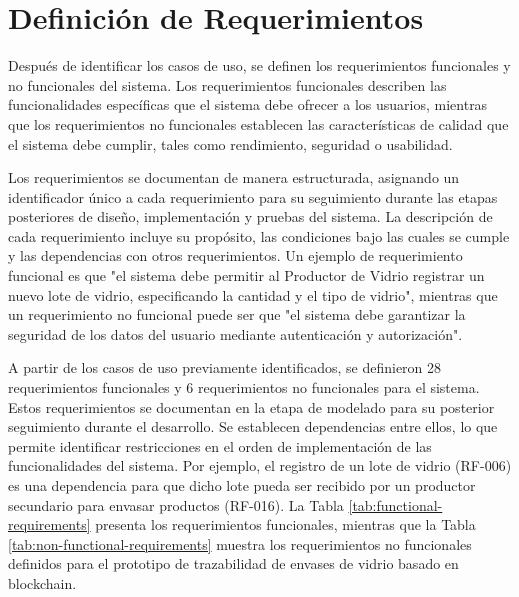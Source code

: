 \section{Definición de Requerimientos}
\label{sec:requirements-definition}

Después de identificar los casos de uso, se definen los requerimientos funcionales y no funcionales del sistema. Los requerimientos funcionales describen las funcionalidades específicas que el sistema debe ofrecer a los usuarios, mientras que los requerimientos no funcionales establecen las características de calidad que el sistema debe cumplir, tales como rendimiento, seguridad o usabilidad.

Los requerimientos se documentan de manera estructurada, asignando un identificador único a cada requerimiento para su seguimiento durante las etapas posteriores de diseño, implementación y pruebas del sistema. La descripción de cada requerimiento incluye su propósito, las condiciones bajo las cuales se cumple y las dependencias con otros requerimientos. Un ejemplo de requerimiento funcional es que "el sistema debe permitir al Productor de Vidrio registrar un nuevo lote de vidrio, especificando la cantidad y el tipo de vidrio", mientras que un requerimiento no funcional puede ser que "el sistema debe garantizar la seguridad de los datos del usuario mediante autenticación y autorización".

A partir de los casos de uso previamente identificados, se definieron 28 requerimientos funcionales y 6 requerimientos no funcionales para el sistema. Estos requerimientos se documentan en la etapa de modelado para su posterior seguimiento durante el desarrollo. Se establecen dependencias entre ellos, lo que permite identificar restricciones en el orden de implementación de las funcionalidades del sistema. Por ejemplo, el registro de un lote de vidrio (RF-006) es una dependencia para que dicho lote pueda ser recibido por un productor secundario para envasar productos (RF-016). La Tabla \ref{tab:functional-requirements} presenta los requerimientos funcionales, mientras que la Tabla \ref{tab:non-functional-requirements} muestra los requerimientos no funcionales definidos para el prototipo de trazabilidad de envases de vidrio basado en blockchain.

